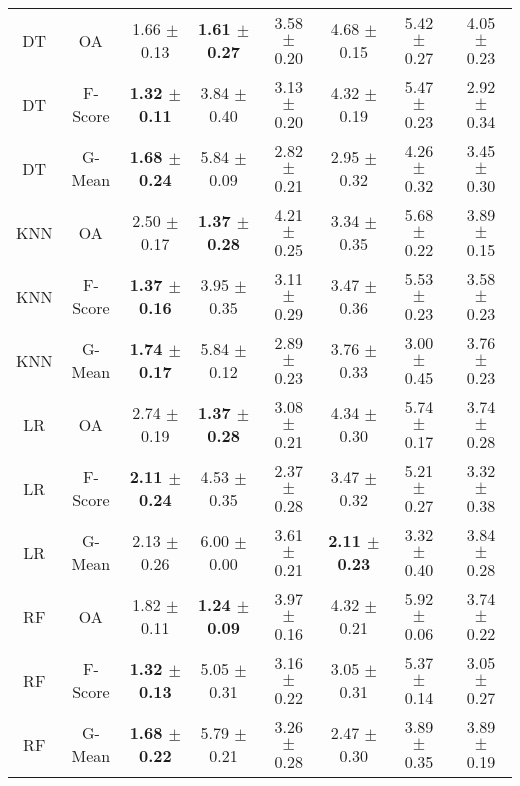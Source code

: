 \begin{longtable}{cccccccc}
\bottomrule
\endlastfoot
        DT &      OA &          1.66 $\pm$ 0.13 & \textbf{1.61 $\pm$ 0.27} & 3.58 $\pm$ 0.20 &          4.68 $\pm$ 0.15 & 5.42 $\pm$ 0.27 & 4.05 $\pm$ 0.23 \\
        DT & F-Score & \textbf{1.32 $\pm$ 0.11} &          3.84 $\pm$ 0.40 & 3.13 $\pm$ 0.20 &          4.32 $\pm$ 0.19 & 5.47 $\pm$ 0.23 & 2.92 $\pm$ 0.34 \\
        DT &  G-Mean & \textbf{1.68 $\pm$ 0.24} &          5.84 $\pm$ 0.09 & 2.82 $\pm$ 0.21 &          2.95 $\pm$ 0.32 & 4.26 $\pm$ 0.32 & 3.45 $\pm$ 0.30 \\
       KNN &      OA &          2.50 $\pm$ 0.17 & \textbf{1.37 $\pm$ 0.28} & 4.21 $\pm$ 0.25 &          3.34 $\pm$ 0.35 & 5.68 $\pm$ 0.22 & 3.89 $\pm$ 0.15 \\
       KNN & F-Score & \textbf{1.37 $\pm$ 0.16} &          3.95 $\pm$ 0.35 & 3.11 $\pm$ 0.29 &          3.47 $\pm$ 0.36 & 5.53 $\pm$ 0.23 & 3.58 $\pm$ 0.23 \\
       KNN &  G-Mean & \textbf{1.74 $\pm$ 0.17} &          5.84 $\pm$ 0.12 & 2.89 $\pm$ 0.23 &          3.76 $\pm$ 0.33 & 3.00 $\pm$ 0.45 & 3.76 $\pm$ 0.23 \\
        LR &      OA &          2.74 $\pm$ 0.19 & \textbf{1.37 $\pm$ 0.28} & 3.08 $\pm$ 0.21 &          4.34 $\pm$ 0.30 & 5.74 $\pm$ 0.17 & 3.74 $\pm$ 0.28 \\
        LR & F-Score & \textbf{2.11 $\pm$ 0.24} &          4.53 $\pm$ 0.35 & 2.37 $\pm$ 0.28 &          3.47 $\pm$ 0.32 & 5.21 $\pm$ 0.27 & 3.32 $\pm$ 0.38 \\
        LR &  G-Mean &          2.13 $\pm$ 0.26 &          6.00 $\pm$ 0.00 & 3.61 $\pm$ 0.21 & \textbf{2.11 $\pm$ 0.23} & 3.32 $\pm$ 0.40 & 3.84 $\pm$ 0.28 \\
        RF &      OA &          1.82 $\pm$ 0.11 & \textbf{1.24 $\pm$ 0.09} & 3.97 $\pm$ 0.16 &          4.32 $\pm$ 0.21 & 5.92 $\pm$ 0.06 & 3.74 $\pm$ 0.22 \\
        RF & F-Score & \textbf{1.32 $\pm$ 0.13} &          5.05 $\pm$ 0.31 & 3.16 $\pm$ 0.22 &          3.05 $\pm$ 0.31 & 5.37 $\pm$ 0.14 & 3.05 $\pm$ 0.27 \\
        RF &  G-Mean & \textbf{1.68 $\pm$ 0.22} &          5.79 $\pm$ 0.21 & 3.26 $\pm$ 0.28 &          2.47 $\pm$ 0.30 & 3.89 $\pm$ 0.35 & 3.89 $\pm$ 0.19 \\
\end{longtable}
